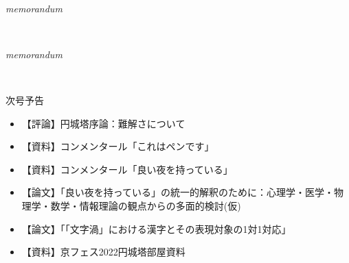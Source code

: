 \documentclass[10pt, a5paper, twoside]{jsarticle}
\theoremstyle{definition}
\begin{document}
	{\Large 　} %

	\begin{center}

		\Large{\textit{memorandum}}

	\end{center}

	\newpage

		{\Large 　} %

	\begin{center}

		\Large{\textit{memorandum}}

	\end{center}

	\newpage

		{\Large 　} %

	\begin{center}

		{\Large 次号予告}

			\vspace{10mm}

		\begin{itemize}

			\item 【評論】円城塔序論：難解さについて

				\vspace{3mm}

			\item 【資料】コンメンタール「これはペンです」

				\vspace{3mm}

			\item 【資料】コンメンタール「良い夜を持っている」

				\vspace{3mm}

			\item 【論文】「良い夜を持っている」の統一的解釈のために：心理学・医学・物理学・数学・情報理論の観点からの多面的検討(仮)

				\vspace{3mm}

			\item 【論文】「「文字渦」における漢字とその表現対象の1対1対応」

				\vspace{3mm}

			\item 【資料】京フェス2022円城塔部屋資料 
		
		\end{itemize}


	\end{center}
\end{document}
